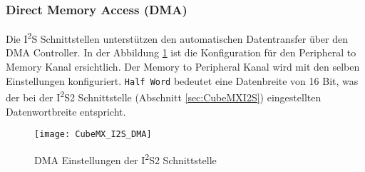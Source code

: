 \subsubsection{Direct Memory Access (DMA)}
\label{sec:CubeMXDMA}

Die I\textsuperscript{2}S Schnittstellen unterstützen den automatischen Datentransfer über den DMA Controller. In der Abbildung \ref{pic:CubeMX_I2S_DMA} ist die Konfiguration für den Peripheral to Memory Kanal ersichtlich. Der Memory to Peripheral Kanal wird mit den selben Einstellungen konfiguriert. \texttt{Half Word} bedeutet eine Datenbreite von 16 Bit, was der bei der I\textsuperscript{2}S2 Schnittstelle (Abschnitt \ref{sec:CubeMXI2S}) eingestellten Datenwortbreite entspricht.

\begin{figure}[H]
	\centering
	\texttt{[image: CubeMX\_I2S\_DMA]}
	\caption{DMA Einstellungen der I\textsuperscript{2}S2 Schnittstelle}
	\label{pic:CubeMX_I2S_DMA}
\end{figure}

